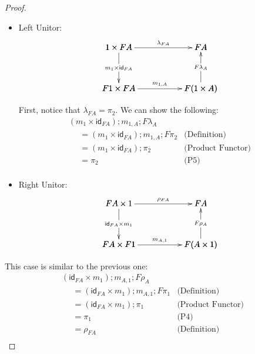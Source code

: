 \documentclass{article}
\newcommand{\id}[0]{\mathsf{id}}
\begin{document}
\begin{proof}
\begin{itemize}
  \item[] Left Unitor:\\
    \[
    \bfig
    \square|amma|/->`->`<-`->/<1000,500>[
      1 \times FA`
      FA`
      F1 \times FA`
      F(1 \times A);
      {\lambda}_{FA}`
      m_{1} \times \id_{FA}`
      F{\lambda}_{A}`
      m_{1,A}]
    \efig
    \]
  
  First, notice that $\lambda_{FA} = \pi_2$. We can show the following:
  \[
  \begin{array}{lll}
    (m_1 \times \id_{FA});m_{1,A};F\lambda_A\\
    \,\,\,\,\,\,\,\,= (m_1 \times \id_{FA});m_{1,A};F\pi_2 & \text{(Definition)}\\
    \,\,\,\,\,\,\,\,= (m_1 \times \id_{FA});\pi_2 & \text{(Product Functor)}\\
    \,\,\,\,\,\,\,\,= \pi_2 & \text{(P5)}\\
  \end{array}
  \]

\item[] Right Unitor:\\
  \[
  \bfig
  \square|amma|/->`->`<-`->/<1000,500>[
    FA \times 1`
    FA`
    FA \times F1`
    F(A \times 1);
    {\rho}_{FA}`
    \id_{FA} \times m_{1}`
    F{\rho}_{A}`
    m_{A,1}]
  \efig
  \]
  \end{itemize}
  This case is similar to the previous one:
  \[
  \begin{array}{lll}
    (\id_{FA} \times m_1);m_{A,1};F\rho_A\\
    \,\,\,\,\,\,\,\,=  (\id_{FA} \times m_1);m_{A,1};F\pi_1 & \text{(Definition)}\\
    \,\,\,\,\,\,\,\,=  (\id_{FA} \times m_1);\pi_1 & \text{(Product Functor)}\\
    \,\,\,\,\,\,\,\,=  \pi_1 & \text{(P4)}\\
    \,\,\,\,\,\,\,\,=  \rho_{FA} & \text{(Definition)}\\
  \end{array}
  \]


\end{proof}
\end{document}
